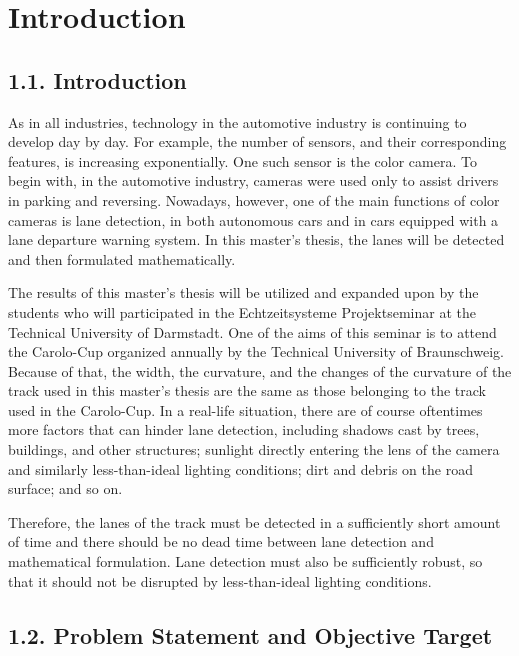 
\chapter{Introduction}\label{cha:Intro}

\section*{1.1. Introduction}
\label{sec:Introduction}

As in all industries, technology in the automotive industry is continuing to develop 
day by day. For example, the number of sensors, and their corresponding features, is 
increasing exponentially. One such sensor is the color camera. To begin with, in the 
automotive industry, cameras were used only to assist drivers in parking and reversing. 
Nowadays, however, one of the main functions of color cameras is lane detection, in both 
autonomous cars and in cars equipped with a lane departure warning system. In this 
master's thesis, the lanes will be detected and then formulated mathematically.

The results of this master's thesis will be utilized and expanded upon by the students 
who will participated in the Echtzeitsysteme Projektseminar at the Technical University 
of Darmstadt. One of the aims of this seminar is to attend the Carolo-Cup organized 
annually by the Technical University of Braunschweig. Because of that, the width, the 
curvature, and the changes of the curvature of the track used in this master's thesis 
are the same as those belonging to the track used in the Carolo-Cup. In a real-life 
situation, there are of course oftentimes more factors that can hinder lane detection, 
including shadows cast by trees, buildings, and other structures; sunlight directly 
entering the lens of the camera and similarly less-than-ideal lighting conditions; 
dirt and debris on the road surface; and so on.

Therefore, the lanes of the track must be detected in a sufficiently short amount of 
time and there should be no dead time between lane detection and mathematical 
formulation. Lane detection must also be sufficiently robust, so that it should not be 
disrupted by less-than-ideal lighting conditions.

\section*{1.2. Problem Statement and Objective Target}
\label{sec:Problem Statement and Objective Target}

